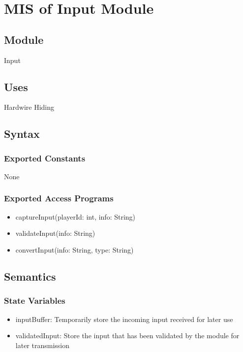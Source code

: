 \documentclass[12pt, titlepage]{article}
\begin{document}
\section{MIS of Input Module} 
\label{IM}

\subsection{Module}
\hspace{1.5em}Input

\subsection{Uses}
\hspace{1.5em}Hardwire Hiding

\subsection{Syntax}

\subsubsection{Exported Constants}
\hspace{1.5em}None

\subsubsection{Exported Access Programs}

\begin{itemize}
\item captureInput(playerId: int, info: String)
\item validateInput(info: String)
\item convertInput(info: String, type: String)
\end{itemize}

\subsection{Semantics}

\subsubsection{State Variables}
\begin{itemize}
\item inputBuffer: Temporarily store the incoming input received for later use
\item validatedInput: Store the input that has been validated by the module for later transmission
\end{itemize}
\end{document}
